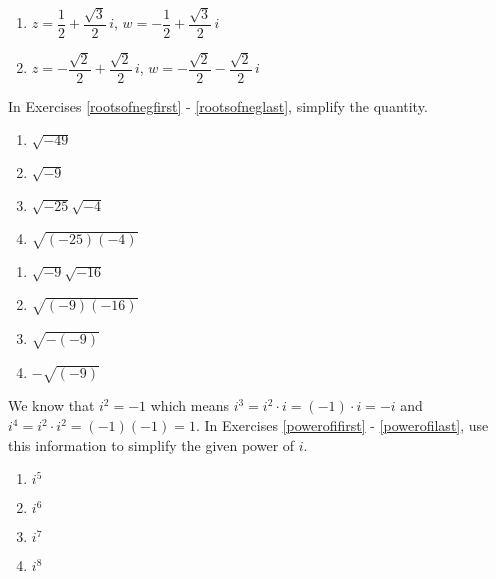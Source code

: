 \begin{multicols}{2}
\begin{enumerate}
\setcounter{enumi}{\value{HW}}

\item  $z = \dfrac{1}{2} + \dfrac{\sqrt{3}}{2} \, i$, $w = -\dfrac{1}{2} + \dfrac{\sqrt{3}}{2} \,i$
\item  $z = -\dfrac{\sqrt{2}}{2} + \dfrac{\sqrt{2}}{2} \, i$, $w = -\dfrac{\sqrt{2}}{2} - \dfrac{\sqrt{2}}{2} \, i$ \label{compnumbasiclast}

\setcounter{HW}{\value{enumi}}
\end{enumerate}
\end{multicols}

In Exercises \ref{rootsofnegfirst} - \ref{rootsofneglast}, simplify the quantity.

\begin{multicols}{4}
\begin{enumerate}
\setcounter{enumi}{\value{HW}}

\item $\sqrt{-49}$ \label{rootsofnegfirst}
\item $\sqrt{-9}$
\item $\sqrt{-25}\sqrt{-4}$
\item $\sqrt{(-25)(-4)}$

\setcounter{HW}{\value{enumi}}
\end{enumerate}
\end{multicols}

\begin{multicols}{4}
\begin{enumerate}
\setcounter{enumi}{\value{HW}}

\item $\sqrt{-9}\sqrt{-16}$
\item $\sqrt{(-9)(-16)}$
\item $\sqrt{-(-9)}$
\item $-\sqrt{(-9)}$ \label{rootsofneglast}

\setcounter{HW}{\value{enumi}}
\end{enumerate}
\end{multicols}

We know that $i^{2} = -1$ which means $i^{3} = i^{2} \cdot i = (-1) \cdot i = -i$ and $i^{4} = i^{2} \cdot i^{2} = (-1)(-1) = 1$. In Exercises \ref{powerofifirst} - \ref{powerofilast}, use this information to simplify the given power of $i$.

\begin{multicols}{4}
\begin{enumerate}
\setcounter{enumi}{\value{HW}}

\item $i^{5}$ \label{powerofifirst}
\item $i ^{6}$
\item $i^{7}$
\item $i^{8}$

\setcounter{HW}{\value{enumi}}
\end{enumerate}
\end{multicols}

